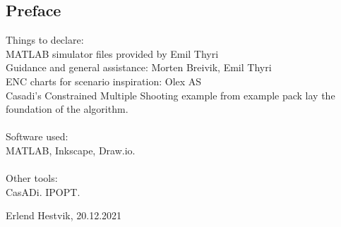 \newpage
\begin{centering}
\section*{Preface}
Things to declare:\hfill\\
MATLAB simulator files provided by Emil Thyri\\
Guidance and general assistance: Morten Breivik, Emil Thyri\\
ENC charts for scenario inspiration: Olex AS\\
Casadi's Constrained Multiple Shooting example from example pack lay the foundation of the algorithm.\\
\hfill\\
Software used:\\
MATLAB, Inkscape, Draw.io.\\
\hfill\\
Other tools:\\
CasADi. IPOPT.


\end{centering}
\begin{center}
    Erlend Hestvik, 20.12.2021
\end{center}

\afterpage{\blankpage}